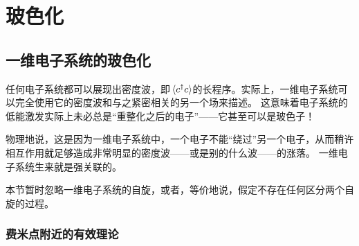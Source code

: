 \chapter{玻色化}

\section{一维电子系统的玻色化}

任何电子系统都可以展现出密度波，即$\expval*{{c}^\dagger {c}}$的长程序。实际上，一维电子系统可以完全使用它的密度波和与之紧密相关的另一个场来描述。
这意味着电子系统的低能激发实际上未必总是“重整化之后的电子”——它甚至可以是玻色子！

物理地说，这是因为一维电子系统中，一个电子不能“绕过”另一个电子，从而稍许相互作用就足够造成非常明显的密度波——或是别的什么波——的涨落。
一维电子系统生来就是强关联的。

本节暂时忽略一维电子系统的自旋，或者，等价地说，假定不存在任何区分两个自旋的过程。

\subsection{费米点附近的有效理论}

